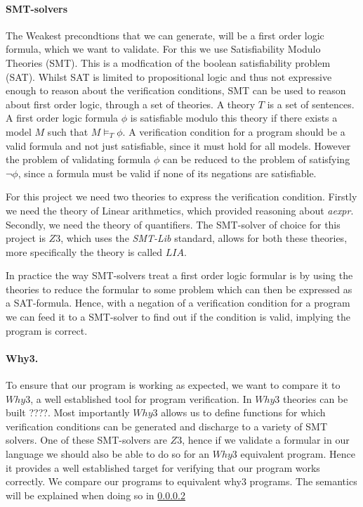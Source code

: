 \paragraph{SMT-solvers}
The Weakest precondtions that we can generate, will be a first order logic formula, which we want to validate. For this we use Satisfiability Modulo Theories (SMT).
This is a modfication of the boolean satisfiability problem (SAT).
Whilst SAT is limited to propositional logic and thus not expressive enough to reason about the verification conditions, SMT can be used to reason about first order logic, through a set of theories.
A theory $T$ is a set of sentences.
A first order logic formula $\phi$ is satisfiable modulo this theory if there exists a model $M$ such that $M \vDash_{T}\phi$. A verification condition for a program should be a valid formula and not just satisfiable, since it must hold for all models. However the problem of validating formula $\phi$ can be reduced to the problem of satisfying $\neg \phi$, since a formula must be valid if none of its negations are satisfiable.

For this project we need two theories to express the verification condition. Firstly we need the theory of Linear arithmetics, which provided reasoning about \textit{aexpr}. Secondly, we need the theory of quantifiers. The SMT-solver of choice for this project is $Z3$, which uses the \textit{SMT-Lib} standard, allows for both these theories, more specifically the theory is called $LIA$\cite{}.

In practice the way SMT-solvers treat a first order logic formular is by using the theories to reduce the formular to some problem which can then be expressed as a SAT-formula. Hence, with a negation of a verification condition for a program we can feed it to a SMT-solver to find out if the condition is valid, implying the program is correct.

\paragraph{Why3.}
To ensure that our program is working as expected, we want to compare it to $Why3$, a well established tool for program verification.
In $Why3$ theories can be built ????.
Most importantly $Why3$ allows us to define functions for which verification conditions can be generated and discharge to a variety of SMT solvers.\cite{}
One of these SMT-solvers are $Z3$, hence if we validate a formular in our language we should also be able to do so for an $Why3$ equivalent program.
Hence it provides a well established target for verifying that our program works correctly. We compare our programs to equivalent why3 programs. The semantics will be explained when doing so in \cref{}

